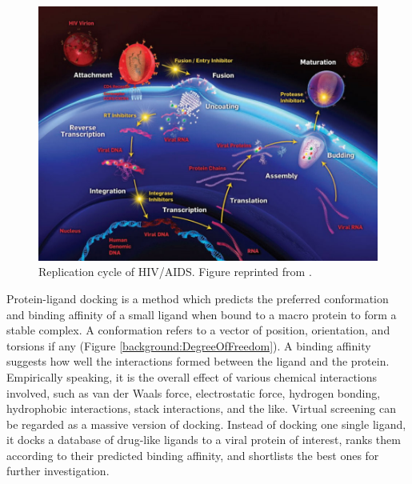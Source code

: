 \begin{figure}[h]
\centering
\includegraphics[width=\textwidth]{Background/HIV.jpg}
\caption{Replication cycle of HIV/AIDS. Figure reprinted from \citep{296}.}
\label{fig:HIV}
\end{figure}

Protein-ligand docking is a method which predicts the preferred conformation and binding affinity of a small ligand when bound to a macro protein to form a stable complex. A conformation refers to a vector of position, orientation, and torsions if any (Figure \ref{background:DegreeOfFreedom}). A binding affinity suggests how well the interactions formed between the ligand and the protein. Empirically speaking, it is the overall effect of various chemical interactions involved, such as van der Waals force, electrostatic force, hydrogen bonding, hydrophobic interactions, stack interactions, and the like. Virtual screening can be regarded as a massive version of docking. Instead of docking one single ligand, it docks a database of drug-like ligands to a viral protein of interest, ranks them according to their predicted binding affinity, and shortlists the best ones for further investigation.

